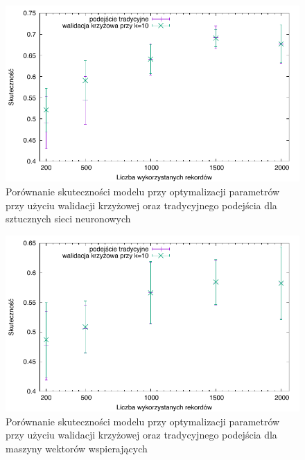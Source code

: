 \begin{figure}
\centering
\includegraphics[scale=\cvsize]{res/cv_ann.pdf}
\caption[Caption for LOF]{Porównanie skuteczności modelu przy optymalizacji parametrów przy użyciu walidacji krzyżowej oraz tradycyjnego podejścia dla sztucznych sieci neuronowych\label{cv_ann}}
\end{figure}

\begin{figure}
\centering
\includegraphics[scale=\cvsize]{res/cv_svm.pdf}
\caption[Caption for LOF]{Porównanie skuteczności modelu przy optymalizacji parametrów przy użyciu walidacji krzyżowej oraz tradycyjnego podejścia dla maszyny wektorów wspierających\label{cv_svm}}
\end{figure}

